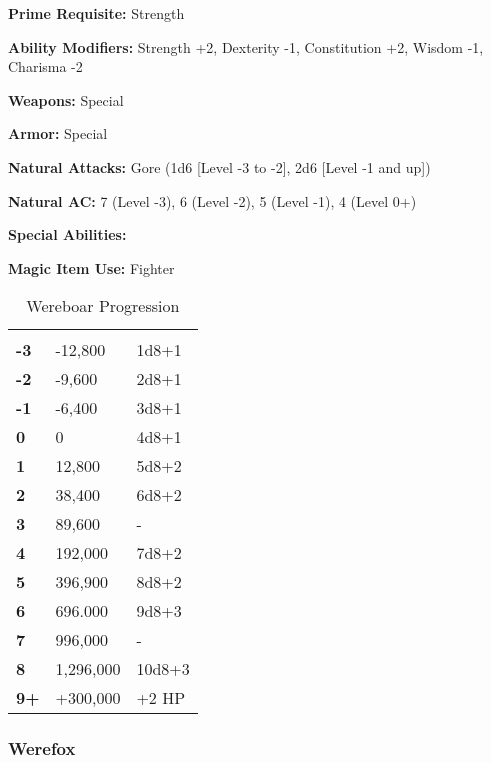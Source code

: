 \begin{multicols*}{2}
{\textbf{Prime Requisite:} Strength

\textbf{Ability Modifiers:} Strength +2, Dexterity -1, Constitution +2, Wisdom -1, Charisma -2

\textbf{Weapons:} Special

\textbf{Armor:} Special

\textbf{Natural Attacks:} Gore (1d6 [Level -3 to -2], 2d6 [Level -1 and up])

\textbf{Natural AC:} 7 (Level -3), 6 (Level -2), 5 (Level -1), 4 (Level 0+)

\textbf{Special Abilities:} 

\textbf{Magic Item Use:} Fighter}

\begin {table}[H]
  \caption{Wereboar Progression}
  \begin{tabularx}{\columnwidth}{>{\bfseries}YYY}
   &  & \\
	-3 & -12,800 & 1d8+1\\
	-2 & -9,600 & 2d8+1\\
	-1 & -6,400 & 3d8+1\\
	0 & 0 & 4d8+1\\
	1 & 12,800 & 5d8+2\\
	2 & 38,400 & 6d8+2\\
	3 & 89,600 & -\\
	4 & 192,000 & 7d8+2\\
	5 & 396,900 & 8d8+2\\
	6 & 696.000 & 9d8+3\\
	7 & 996,000 & -\\
	8 & 1,296,000 & 10d8+3\\
	9+ & +300,000 & +2 HP
  \end {tabularx}
\end {table}

\subsubsection{Werefox}
\end{multicols*}
